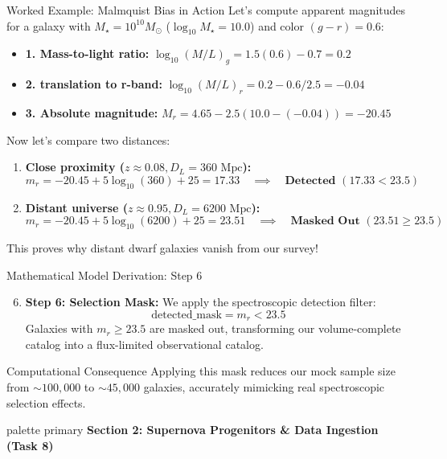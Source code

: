 \documentclass[9pt]{beamer}
\begin{document}
\begin{frame}{Worked Example: Malmquist Bias in Action}
  Let's compute apparent magnitudes for a galaxy with $M_\star = 10^{10} M_\odot$ ($\log_{10} M_\star = 10.0$) and color $(g-r) = 0.6$:
  \begin{itemize}
    \item \textbf{1. Mass-to-light ratio:} $\log_{10}(M/L)_g = 1.5(0.6) - 0.7 = 0.2$
    \item \textbf{2. translation to r-band:} $\log_{10}(M/L)_r = 0.2 - 0.6/2.5 = -0.04$
    \item \textbf{3. Absolute magnitude:} $M_r = 4.65 - 2.5(10.0 - (-0.04)) = -20.45$
  \end{itemize}
  Now let's compare two distances:
  \begin{enumerate}
    \item \textbf{Close proximity ($z \approx 0.08, D_L = 360\text{ Mpc}$):}
      $$m_r = -20.45 + 5\log_{10}(360) + 25 = 17.33 \quad \implies \quad \textbf{Detected } (17.33 < 23.5)$$
    \item \textbf{Distant universe ($z \approx 0.95, D_L = 6200\text{ Mpc}$):}
      $$m_r = -20.45 + 5\log_{10}(6200) + 25 = 23.51 \quad \implies \quad \textbf{Masked Out } (23.51 \ge 23.5)$$
  \end{enumerate}
  This proves why distant dwarf galaxies vanish from our survey!
\end{frame}

\begin{frame}{Mathematical Model Derivation: Step 6}
  \begin{enumerate}
    \setcounter{enumi}{5}
    \item \textbf{Step 6: Selection Mask:}
      We apply the spectroscopic detection filter:
      $$\text{detected\_mask} = m_r < 23.5$$
      Galaxies with $m_r \ge 23.5$ are masked out, transforming our volume-complete catalog into a flux-limited observational catalog.
  \end{enumerate}
  \begin{alertblock}{Computational Consequence}
    Applying this mask reduces our mock sample size from $\sim 100,000$ to $\sim 45,000$ galaxies, accurately mimicking real spectroscopic selection effects.
  \end{alertblock}
\end{frame}

\begin{frame}[plain]
  \vfill
  \centering
  \begin{beamercolorbox}[sep=8pt,center,shadow=true,rounded=true]{palette primary}
    \textbf{Section 2: Supernova Progenitors \& Data Ingestion (Task 8)}
  \end{beamercolorbox}
  \vfill
\end{frame}
\end{document}
